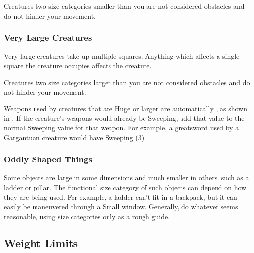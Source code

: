        Creatures two size categories smaller than you are not considered obstacles and do not hinder your movement.

    \subsubsection{Very Large Creatures}\label{Very Large Creatures}
       Very large creatures take up multiple squares. Anything which affects a single square the creature occupies affects the creature.

       Creatures two size categories larger than you are not considered obstacles and do not hinder your movement.

       Weapons used by creatures that are Huge or larger are automatically , as shown in .
      If the creature's weapons would already be Sweeping, add that value to the normal Sweeping value for that weapon.
      For example, a greatsword used by a Gargantuan creature would have Sweeping (3).

    \subsubsection{Oddly Shaped Things}\label{Oddly Shaped Things}
      Some objects are large in some dimensions and much smaller in others, such as a ladder or pillar.
      The functional size category of such objects can depend on how they are being used.
      For example, a ladder can't fit in a backpack, but it can easily be maneuvered through a Small window.
      Generally, do whatever seems reasonable, using size categories only as a rough guide.

  \subsection{Weight Limits}\label{Weight Limits}


